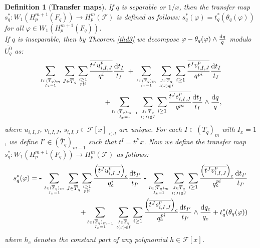 \documentclass[times,10pt]{amsart}
\newcommand{\dd}{{\rm d}}
\newcommand{\F}{\ensuremath{\mathcal{F}}}
\renewcommand{\phi}{\varphi}
\newtheorem{defn}[thm]{Definition}%
\begin{document}
\begin{defn}[{\bf Transfer maps}]\label{dfntr} 
  If $q$ is separable or $1/x$, then {the transfer map $s_q^*: W_1(H_p^{m+1}(F_q))\xrightarrow{} H_p^m(\F)$ is defined as follows:}  $ s_q^*(\phi)= t_q^*( \theta_q(\phi))$ for all $\phi\in W_1(H_p^{m+1}(F_q))$.\\

  If $q$ is inseparable, then  by Theorem \ref{thd3} we decompose   $\phi- \theta_q(\phi)\wedge \frac{\dd q}{q}$ modulo $\overline{U^0_q}$  as:   \begin{align*} {\sum\limits_{I\in (\overline{T}_q)_m\atop  I_x=1}\sum\limits_{J\in \overline{T}_q}\sum\limits_{i\geq 1\atop p\nmid i}{ \frac{\overline{ t^J u_{{i},I,J}^p}}{q^{i}}\frac{\dd t_I}{t_I}}\;+\sum\limits_{I\in (\overline{T}_q)_m\atop  I_x=1}\sum_{J\in \overline{T}_q\atop l(J)\notin \tilde{ I}}\sum\limits_{i\geq 1}{ \frac{\overline{ t^J v_{i,I,J}^p}}{q^{pi}}\frac{\dd t_I}{t_I}}}\\+{\sum\limits_{I\in (\overline{T}_q)_{m-1}\atop I_x=1}\sum_{J\in \overline{T}_q\atop l(J)\notin\tilde{I}} \sum\limits_{i\geq 1} { \frac{\overline{t^Js^p_{{i},I,J}}}{q^{pi}}\frac{\dd t_I}{t_I}\wedge \frac{\dd q}{q}},}  \end{align*}
 where $u_{i,I,J}$, $v_{i,I,J}$, $s_{i,I,J}\in \F[x]_{<d}$ are unique. For each   $I\in (\overline{T}_q)_m$ with $I_x=1$, we define $ I'\in (\overline{T}_q)_{m-1}$ such that  $t^I= t^{I'}x$.  Now we define the transfer map $ s_q^*:W_1(H_p^{m+1}(F_q))\xrightarrow{} H_p^m(\F) $ {as follows:}   {\begin{align*}  s_q^*(\phi)={{{\textbf{-}}}\sum\limits_{I\in (\overline{T}_q)_m\atop   I_x=1}\sum\limits_{J\in \overline{T}_q}\sum\limits_{i\geq 1\atop p\nmid i}{ \frac{\left(\overline{ t^J u_{{i},I,J}^p}\right)_c}{q_c^{i}}\frac{\dd t_{I'}}{t_{I'}}}\; {{\textbf{-}}}\sum\limits_{I\in (\overline{T}_q)_m\atop  I_x=1}\sum_{J\in \overline{T}_q\atop l(J)\notin \tilde{ I}}\sum\limits_{i\geq 1}{ \frac{\left(\overline{ t^J v_{i,I,J}^p}\right)_c}{q^{pi}_c}\frac{\dd t_{I'}}{t_{I'}}}}\\+{\sum\limits_{I\in (\overline{T}_q)_{m-1}\atop I_x=1}\sum_{J\in \overline{T}_q\atop l(J)\notin\tilde{I}} \sum\limits_{i\geq 1} { \frac{\left(\overline{t^Js^p_{{i},I,J}}\right)_c}{q^{pi}_c}\frac{\dd t_{I'}}{t_{I'}}\wedge \frac{\dd q_c}{q_c}}+ t_q^*(\theta_q(\phi))}  \end{align*}} where $h_c$ denotes the constant part of any polynomial $h\in \F[x]$.
               \end{defn}
               
\end{document}
